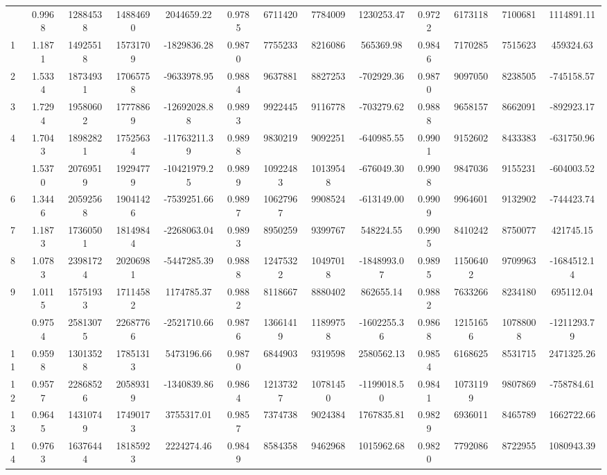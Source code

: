 \documentclass[
  12pt,
]{article}
\begin{document}
\begin{longtable}[t]{lcccccccccccc}
\endfoot
\bottomrule
\endlastfoot
0 & 0.9968 & 12884538 & 14884690 & 2044659.22 & 0.9785 & 6711420 & 7784009 & 1230253.47 & 0.9722 & 6173118 & 7100681 & 1114891.11\\
1 & 1.1871 & 14925518 & 15731709 & -1829836.28 & 0.9870 & 7755233 & 8216086 & 565369.98 & 0.9846 & 7170285 & 7515623 & 459324.63\\
2 & 1.5334 & 18734931 & 17065758 & -9633978.95 & 0.9884 & 9637881 & 8827253 & -702929.36 & 0.9870 & 9097050 & 8238505 & -745158.57\\
3 & 1.7294 & 19580602 & 17778869 & -12692028.88 & 0.9893 & 9922445 & 9116778 & -703279.62 & 0.9888 & 9658157 & 8662091 & -892923.17\\
4 & 1.7043 & 18982821 & 17525634 & -11763211.39 & 0.9898 & 9830219 & 9092251 & -640985.55 & 0.9901 & 9152602 & 8433383 & -631750.96\\
\addlinespace
5 & 1.5370 & 20769519 & 19294779 & -10421979.25 & 0.9899 & 10922483 & 10139548 & -676049.30 & 0.9908 & 9847036 & 9155231 & -604003.52\\
6 & 1.3446 & 20592568 & 19041426 & -7539251.66 & 0.9897 & 10627967 & 9908524 & -613149.00 & 0.9909 & 9964601 & 9132902 & -744423.74\\
7 & 1.1873 & 17360501 & 18149844 & -2268063.04 & 0.9893 & 8950259 & 9399767 & 548224.55 & 0.9905 & 8410242 & 8750077 & 421745.15\\
8 & 1.0783 & 23981724 & 20206981 & -5447285.39 & 0.9888 & 12475322 & 10497018 & -1848993.07 & 0.9895 & 11506402 & 9709963 & -1684512.14\\
9 & 1.0115 & 15751933 & 17114582 & 1174785.37 & 0.9882 & 8118667 & 8880402 & 862655.14 & 0.9882 & 7633266 & 8234180 & 695112.04\\
\addlinespace
10 & 0.9754 & 25813075 & 22687766 & -2521710.66 & 0.9876 & 13661419 & 11899758 & -1602255.36 & 0.9868 & 12151656 & 10788008 & -1211293.79\\
11 & 0.9598 & 13013528 & 17851313 & 5473196.66 & 0.9870 & 6844903 & 9319598 & 2580562.13 & 0.9854 & 6168625 & 8531715 & 2471325.26\\
12 & 0.9577 & 22868526 & 20589319 & -1340839.86 & 0.9864 & 12137327 & 10781450 & -1199018.50 & 0.9841 & 10731199 & 9807869 & -758784.61\\
13 & 0.9645 & 14310749 & 17490173 & 3755317.01 & 0.9857 & 7374738 & 9024384 & 1767835.81 & 0.9829 & 6936011 & 8465789 & 1662722.66\\
14 & 0.9763 & 16376444 & 18185923 & 2224274.46 & 0.9849 & 8584358 & 9462968 & 1015962.68 & 0.9820 & 7792086 & 8722955 & 1080943.39\\

\end{longtable}
\end{document}
